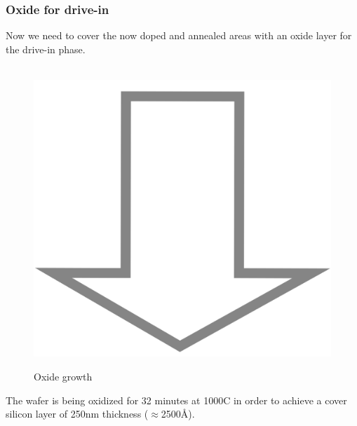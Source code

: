 \subsubsection{Oxide for drive-in}
Now we need to cover the now doped and annealed areas with an oxide layer for the drive-in phase.
\begin{figure}[H]
	\centering
	\begin{tikzpicture}[node distance = 3cm, auto, thick,scale=\CrossSectionOnly, every node/.style={transform shape}]
		
	\end{tikzpicture} \\
	\includegraphics[scale=0.01]{down_arrow.png} \\
	\begin{tikzpicture}[node distance = 3cm, auto, thick,scale=\CrossSectionOnly, every node/.style={transform shape}]
		
	\end{tikzpicture}
	\caption{Oxide growth}
\end{figure}
The wafer is being oxidized for 32 minutes at 1000\degree C in order to achieve a cover silicon layer of 250nm thickness ($\approx$2500\normalfont\AA).

